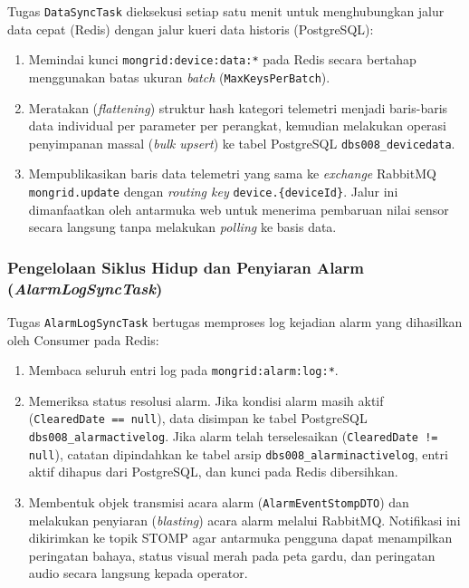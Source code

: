Tugas \texttt{DataSyncTask} dieksekusi setiap satu menit untuk menghubungkan jalur data cepat (Redis) dengan jalur kueri data historis (PostgreSQL):
\begin{enumerate}[label=\arabic*., leftmargin=*, itemsep=0pt]
  \item Memindai kunci \texttt{mongrid:device:data:*} pada Redis secara bertahap menggunakan batas ukuran \textit{batch} (\texttt{MaxKeysPerBatch}).
  \item Meratakan (\textit{flattening}) struktur hash kategori telemetri menjadi baris-baris data individual per parameter per perangkat, kemudian melakukan operasi penyimpanan massal (\textit{bulk upsert}) ke tabel PostgreSQL \texttt{dbs008\_devicedata}.
  \item Mempublikasikan baris data telemetri yang sama ke \textit{exchange} RabbitMQ \texttt{mongrid.update} dengan \textit{routing key} \texttt{device.\{deviceId\}}. Jalur ini dimanfaatkan oleh antarmuka web untuk menerima pembaruan nilai sensor secara langsung tanpa melakukan \textit{polling} ke basis data.
\end{enumerate}

\subsubsection{Pengelolaan Siklus Hidup dan Penyiaran Alarm (\textit{AlarmLogSyncTask})}

Tugas \texttt{AlarmLogSyncTask} bertugas memproses log kejadian alarm yang dihasilkan oleh Consumer pada Redis:
\begin{enumerate}[label=\arabic*., leftmargin=*, itemsep=0pt]
  \item Membaca seluruh entri log pada \texttt{mongrid:alarm:log:*}.
  \item Memeriksa status resolusi alarm. Jika kondisi alarm masih aktif (\texttt{ClearedDate == null}), data disimpan ke tabel PostgreSQL \texttt{dbs008\_alarmactivelog}. Jika alarm telah terselesaikan (\texttt{ClearedDate != null}), catatan dipindahkan ke tabel arsip \texttt{dbs008\_alarminactivelog}, entri aktif dihapus dari PostgreSQL, dan kunci pada Redis dibersihkan.
  \item Membentuk objek transmisi acara alarm (\texttt{AlarmEventStompDTO}) dan melakukan penyiaran (\textit{blasting}) acara alarm melalui RabbitMQ. Notifikasi ini dikirimkan ke topik STOMP agar antarmuka pengguna dapat menampilkan peringatan bahaya, status visual merah pada peta gardu, dan peringatan audio secara langsung kepada operator.
\end{enumerate}

